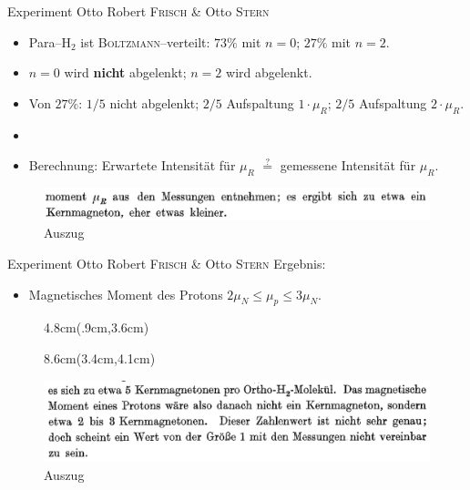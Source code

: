 \documentclass[t,9pt]{beamer}
\newcommand{\highlight}[3]{ \begin{textblock*}{#1}(#2,#3) \begin{tcolorbox} [enhanced,opacityfill=.1,colback=blue] \end{tcolorbox} \end{textblock*} } %
\begin{document}
        \begin{frame}{Experiment Otto Robert \textsc{Frisch} \& Otto \textsc{Stern}}
                \begin{itemize}
                        \item Para--$\text{H}_2$ ist \textsc{Boltzmann}--verteilt: $73\%$ mit $n=0$; $27\%$ mit $n=2$.
                        \item $n=0$ wird \textbf{nicht} abgelenkt; $n=2$ wird abgelenkt.
                        \item Von $27\%$: $1/5$ nicht abgelenkt; $2/5$ Aufspaltung $1\cdot \mu _R$; $2/5$ Aufspaltung $2\cdot \mu _R$.
                                \pause
                        \item[]
                        \item Berechnung: Erwartete Intensität für $\mu _R$ $\stackrel{?}{=}$ gemessene Intensität für $\mu _R$.
                \end{itemize}
                \begin{figure}
                        \centering
                        \includegraphics[width=\textwidth]{prosi_ergebnis_rotationsmoment.png}
                        \caption*{Auszug \cite{FrischStern1933}}
                \end{figure}
        \end{frame}

        \begin{frame}{Experiment Otto Robert \textsc{Frisch} \& Otto \textsc{Stern}}
                Ergebnis:
                \begin{itemize}
                        \item Magnetisches Moment des Protons $2\mu _N\leq \mu _p\leq 3\mu _N$.
                \end{itemize}
                \begin{figure}
                        \highlight{4.8cm}{.9cm}{3.6cm}
                        \highlight{8.6cm}{3.4cm}{4.1cm}
                        \includegraphics[width=.9\textwidth]{prosi_mag_moment_proton_nicht_1.png}
                        \caption*{Auszug \cite{FrischStern1933}}
                \end{figure}
        \end{frame}
\end{document}
